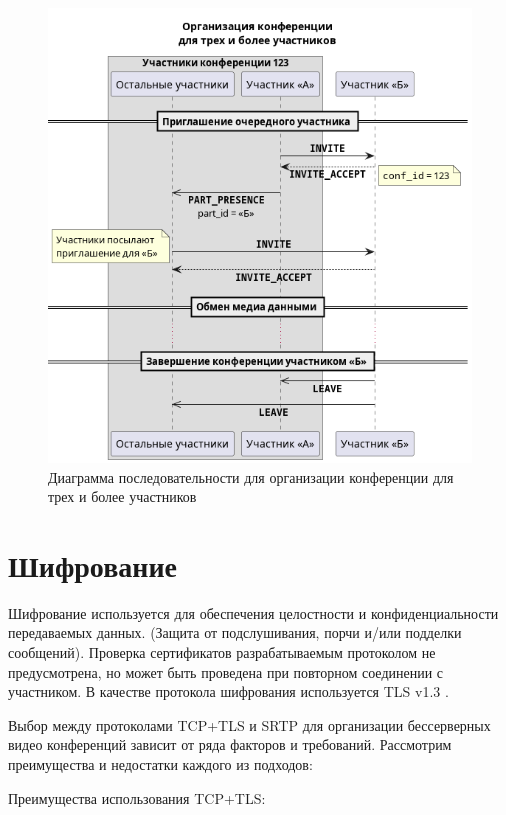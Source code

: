 \begin{figure}[H]
  \centering
  \includegraphics[width=0.9\linewidth]{inc/diag/seq-3/conf-3.png}
  \caption{Диаграмма последовательности для организации конференции для трех и более участников}
  \label{img:conf-3}
\end{figure}

\section{Шифрование}

Шифрование используется для обеспечения целостности и конфиденциальности передаваемых данных. (Защита от подслушивания, порчи и/или подделки сообщений).
Проверка сертификатов разрабатываемым протоколом не предусмотрена, но может быть проведена при повторном соединении с участником.
В качестве протокола шифрования используется TLS v1.3 \cite{tls}.


Выбор между протоколами TCP+TLS и SRTP для организации бессерверных видео конференций зависит от ряда факторов и требований. Рассмотрим преимущества и недостатки каждого из подходов:

Преимущества использования TCP+TLS:

